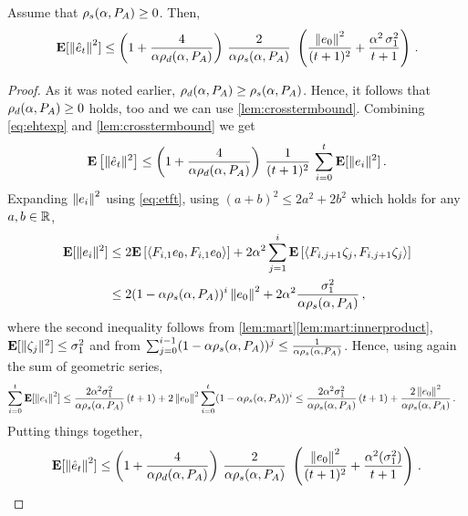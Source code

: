 \begin{theorem}\label{th:pdrate}
Assume that $\rho_s(\alpha,P_A)\ge 0$. Then,
\begin{align}
\mathbf{E}[\left\| \hat{e}_t\right\|^2]
\leq \left(1+\frac4{\alpha\rho_d(\alpha,P_A)}\right)\, \frac2{\alpha\rho_s(\alpha,P_A)}\, \,
\left(\frac{\left\| e_0\right\|^2}{(t+1)^2}+ \frac{\alpha^2 \,\sigma_1^2}{t+1} \right)\,.
\end{align}
\end{theorem}
\begin{proof}
As it was noted earlier, $\rho_d(\alpha,P_A)\ge \rho_s(\alpha,P_A)$. Hence, it follows that $\rho_d(\alpha,P_A)\ge 0$ holds, too
and we can use  \cref{lem:crosstermbound}.
Combining \eqref{eq:ehtexp} and \cref{lem:crosstermbound} we get
\begin{align*}
\mathbf{E}\left[\| \hat{e}_t\|^2\right] \le  
\left( 1+\frac4{\alpha\rho_d(\alpha,P_A)} \right)\,
\frac{1}{(t+1)^2} \, \sum_{i=0}^{t}\mathbf{E}[\| e_i\|^2]\,.
\end{align*}
Expanding $\left\| e_i\right\|^2$ using \eqref{eq:etft},
using $(a+b)^2\leq 2 a^2+2 b^2$ which holds for any $a,b\in \mathbb{R}$,
\begin{align*}
\mathbf{E}[\| e_i\|^2]
&\le  2 \mathbf{E}\left[\langle F_{i,1}e_0,F_{i,1}e_0\rangle\right]+2 \alpha^2\sum_{j=1}^i\mathbf{E}\left[\langle F_{i,j+1}\zeta_j, F_{i,j+1}\zeta_j\rangle\right]\\
& \le 2 (1-\alpha\rho_s(\alpha,P_A))^i\left\| e_0\right\|^2+ 2 \alpha^2\frac{{\sigma}_1^2}{\alpha \rho_s(\alpha,P_A)}\,,
\end{align*}
where the second inequality follows from 
 \cref{lem:mart}\ref{lem:mart:innerproduct}, $\mathbf{E}[ \| \zeta_j\|^2 ] \le \sigma_1^2$
 and from  $\sum_{j=0}^{i-1} (1-\alpha \rho_s(\alpha,P_A))^j\leq \frac{1}{\alpha \rho_s(\alpha,P_A)}$. 
 Hence, using again the sum of geometric series,
\begin{align*}
\sum_{i=0}^t \mathbf{E}[ \left\| e_i\right\|^2 ] 
& \le
\frac{ 2 \alpha^2{\sigma}_1^2}{\alpha \rho_s(\alpha,P_A)}\,(t+1) +
 2 \left\| e_0\right\|^2 \sum_{i=0}^t(1-\alpha\rho_s(\alpha,P_A))^i  
 \le
\frac{ 2 \alpha^2 {\sigma}_1^2}{\alpha \rho_s(\alpha,P_A)}\,(t+1) +
 \frac{2 \left\| e_0\right\|^2}{\alpha\rho_s(\alpha,P_A)} \,.
\end{align*}
Putting things together,
\begin{align*}
\mathbf{E}[\left\| \hat{e}_t\right\|^2]
\leq \left(1+\frac4{\alpha\rho_d(\alpha,P_A)}\right)\, \frac2{\alpha\rho_s(\alpha,P_A)}\, \,
\left(\frac{\left\| e_0\right\|^2}{(t+1)^2}+ \frac{\alpha^2(\sigma_1^2)}{t+1} \right)\,.
\end{align*}
\end{proof}

